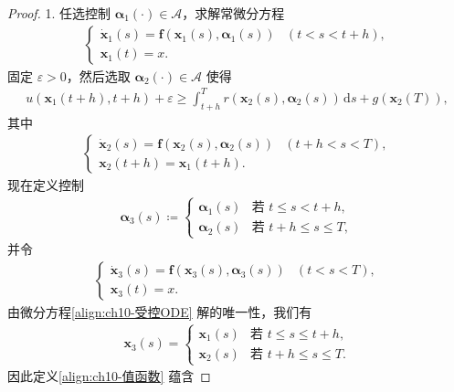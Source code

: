 \documentclass[../../main.tex]{subfiles}
\begin{document}
\begin{proof}
1. 任选控制 $\boldsymbol{\alpha}_1(\cdot)\in\mathcal{A}$，求解常微分方程
\begin{align}
\begin{cases}
\dot{\mathbf{x}}_1(s)=\mathbf{f}(\mathbf{x}_1(s),\boldsymbol{\alpha}_1(s)) & (t<s<t+h),\\
\mathbf{x}_1(t)=x.
\end{cases}
\label{align:ch10-控制1}
\end{align}
固定 $\varepsilon>0$，然后选取 $\boldsymbol{\alpha}_2(\cdot)\in\mathcal{A}$ 使得
\begin{align}
u(\mathbf{x}_1(t+h),t+h)+\varepsilon\geqslant \int_{t+h}^T r(\mathbf{x}_2(s),\boldsymbol{\alpha}_2(s))\,\mathrm{d}s+g(\mathbf{x}_2(T)),
\label{align:ch10-控制2不等式}
\end{align}
其中
\begin{align}
\begin{cases}
\dot{\mathbf{x}}_2(s)=\mathbf{f}(\mathbf{x}_2(s),\boldsymbol{\alpha}_2(s)) & (t+h<s<T),\\
\mathbf{x}_2(t+h)=\mathbf{x}_1(t+h).
\end{cases}
\label{align:ch10-控制2}
\end{align}
现在定义控制
\begin{align}
\boldsymbol{\alpha}_3(s)\coloneqq
\begin{cases}
\boldsymbol{\alpha}_1(s) & \text{若 } t\leqslant s<t+h,\\
\boldsymbol{\alpha}_2(s) & \text{若 } t+h\leqslant s\leqslant T,
\end{cases}
\label{align:ch10-控制3}
\end{align}
并令
\begin{align}
\begin{cases}
\dot{\mathbf{x}}_3(s)=\mathbf{f}(\mathbf{x}_3(s),\boldsymbol{\alpha}_3(s)) & (t<s<T),\\
\mathbf{x}_3(t)=x.
\end{cases}
\label{align:ch10-控制3ODE}
\end{align}
由微分方程\eqref{align:ch10-受控ODE} 解的唯一性，我们有
\begin{align}
\mathbf{x}_3(s)=
\begin{cases}
\mathbf{x}_1(s) & \text{若 } t\leqslant s\leqslant t+h,\\
\mathbf{x}_2(s) & \text{若 } t+h\leqslant s\leqslant T.
\end{cases}
\label{align:ch10-状态拼接}
\end{align}
因此定义\eqref{align:ch10-值函数} 蕴含

\end{proof}
\end{document}
